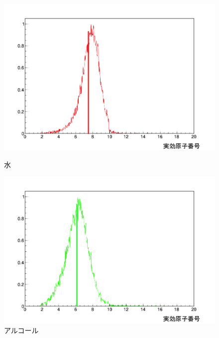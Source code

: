 \begin{figure}[H]
 \begin{minipage}{0.5\hsize}
  \begin{center}
   \includegraphics[bb=0.000000 0.000000 618.188896 429.564489,width=1.0\hsize]{image2/chapter5/Z_water.png}
  \end{center}  
\vspace{-1cm}
\caption*{水}
 \end{minipage}
 \begin{minipage}{0.5\hsize}
  \begin{center}
   \includegraphics[bb=0.000000 0.000000 618.188896 429.564489,width=1.0\hsize]{image2/chapter5/Z_alcohol.png}
  \end{center}
\vspace{-1cm}
\caption*{アルコール}
 \end{minipage}

\end{figure}
